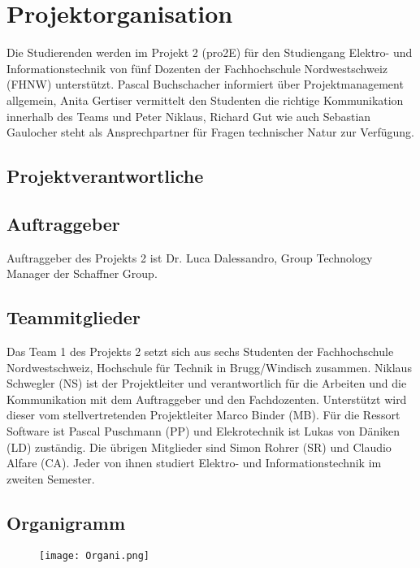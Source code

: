 \section{Projektorganisation}

Die Studierenden werden im Projekt 2 (pro2E) für den Studiengang Elektro- und Informationstechnik von fünf Dozenten der Fachhochschule Nordwestschweiz (FHNW) unterstützt. Pascal Buchschacher informiert über Projektmanagement allgemein, Anita Gertiser vermittelt den Studenten die richtige Kommunikation innerhalb des Teams und Peter Niklaus, Richard Gut  wie auch Sebastian Gaulocher steht als Ansprechpartner für Fragen technischer Natur zur Verfügung.
\subsection{Projektverantwortliche}

\subsection{Auftraggeber}
Auftraggeber des Projekts 2 ist Dr. Luca Dalessandro, Group Technology Manager der Schaffner Group.

\subsection{Teammitglieder}
Das Team 1 des Projekts 2 setzt sich aus sechs Studenten der Fachhochschule Nordwestschweiz, Hochschule für Technik in Brugg/Windisch zusammen. Niklaus Schwegler (NS) ist der Projektleiter und verantwortlich für die Arbeiten und die Kommunikation mit dem Auftraggeber und den Fachdozenten. Unterstützt wird dieser vom stellvertretenden Projektleiter \newline Marco  Binder (MB). Für die Ressort Software ist Pascal Puschmann (PP) und Elekrotechnik ist Lukas von Däniken (LD) zuständig. Die übrigen Mitglieder sind Simon Rohrer (SR) und Claudio Alfare (CA). Jeder von ihnen studiert Elektro- und Informationstechnik im zweiten Semester.

\subsection{Organigramm}
\begin{figure}[H]
	\centering
	\texttt{[image: Organi.png]}
	\label{fig:Organigramm}
\end{figure}
